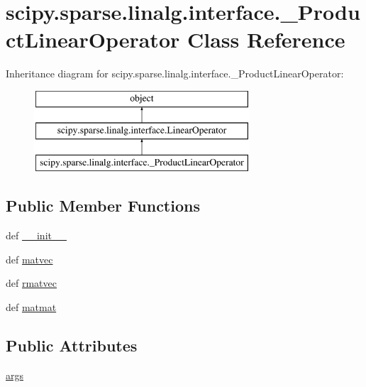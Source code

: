\hypertarget{classscipy_1_1sparse_1_1linalg_1_1interface_1_1__ProductLinearOperator}{}\section{scipy.\+sparse.\+linalg.\+interface.\+\_\+\+Product\+Linear\+Operator Class Reference}
\label{classscipy_1_1sparse_1_1linalg_1_1interface_1_1__ProductLinearOperator}
Inheritance diagram for scipy.\+sparse.\+linalg.\+interface.\+\_\+\+Product\+Linear\+Operator\+:\begin{figure}[H]
\begin{center}
\leavevmode
\includegraphics[height=3.000000cm]{classscipy_1_1sparse_1_1linalg_1_1interface_1_1__ProductLinearOperator}
\end{center}
\end{figure}
\subsection*{Public Member Functions}
\begin{DoxyCompactItemize}
\item 
def \hyperlink{classscipy_1_1sparse_1_1linalg_1_1interface_1_1__ProductLinearOperator_a5f08303866612eb4c14f527f96a6547f}{\+\_\+\+\_\+init\+\_\+\+\_\+}
\item 
def \hyperlink{classscipy_1_1sparse_1_1linalg_1_1interface_1_1__ProductLinearOperator_ae353155937851014d77e39c4d5e8675f}{matvec}
\item 
def \hyperlink{classscipy_1_1sparse_1_1linalg_1_1interface_1_1__ProductLinearOperator_a4d246c0446c3b557793c1323ca8d9886}{rmatvec}
\item 
def \hyperlink{classscipy_1_1sparse_1_1linalg_1_1interface_1_1__ProductLinearOperator_a48334148170bbc688a86b1fc6a059bf7}{matmat}
\end{DoxyCompactItemize}
\subsection*{Public Attributes}
\begin{DoxyCompactItemize}
\item 
\hyperlink{classscipy_1_1sparse_1_1linalg_1_1interface_1_1__ProductLinearOperator_a10afe4bbbb1d7b58c305b843714a07db}{args}
\end{DoxyCompactItemize}


